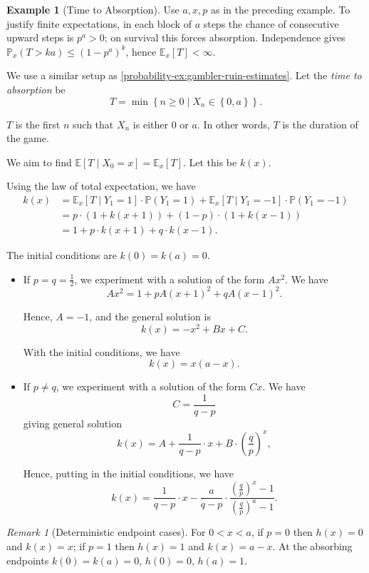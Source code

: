 \documentclass[11pt]{article}
\numberwithin{equation}{section}
\theoremstyle{definition}
\newtheorem{example}[theorem]{Example}
\theoremstyle{remark}
\newtheorem{remark}[theorem]{Remark}
\newcommand{\pqty}[1]{\left(#1\right)}
\newcommand{\bqty}[1]{\left[#1\right]}
\newcommand{\Bqty}[1]{\left\{#1\right\}}
\newcommand{\set}[2]{\left\{#1\mid #2\right\}}
\newcommand{\Prob}{\mathbb P}
\newcommand{\Expt}{\mathbb E}
\newcommand{\Conditional}[2]{#1\mid #2}
\begin{document}
\begin{example}[Time to Absorption]\label{probability-example-030}
    \label{probability-ex:time-to-absorption}%
Use \(a,x,p\) as in the preceding example. To justify finite expectations, in each block of \(a\) steps the chance of consecutive upward steps is \(p^a>0\); on survival this forces absorption. Independence gives
\(\Prob_x(T>ka)\le(1-p^a)^k\), hence \(\Expt_x[T]<\infty\).

    We use a similar setup as \autoref{probability-ex:gambler-ruin-estimates}. Let the \emph{time to absorption} be
    \[
        T = \min \set{n \geq 0}{X_n \in \Bqty{0, a}}.
    \]

    \(T\) is the first \(n\) such that \(X_n\) is either \(0\) or \(a\). In other words, \(T\) is the duration of the game.

    We aim to find \(\Expt\bqty{\Conditional{T}{X_0 = x}} = \Expt_x\bqty{T}\). Let this be \(k\pqty{x}\).

    Using the law of total expectation, we have
    \begin{align*}
        k\pqty{x} &= \Expt_x\bqty{\Conditional{T}{Y_1 = 1}} \cdot \Prob\pqty{Y_1 = 1} + \Expt_x\bqty{\Conditional{T}{Y_1 = -1}} \cdot \Prob\pqty{Y_1 = -1} \\
        &= p \cdot \pqty{1 + k\pqty{x + 1}} + \pqty{1 - p} \cdot \pqty{1 + k\pqty{x - 1}} \\
        &= 1 + p \cdot k\pqty{x + 1} + q \cdot k\pqty{x - 1}.
    \end{align*}

    The initial conditions are \(k \pqty{0} = k \pqty{a} = 0\).
    \begin{itemize}
        \item If \(p = q = \frac{1}{2}\), we experiment with a solution of the form \(A x^2\). We have
        \[
            A x^2 = 1 + p A\pqty{x + 1}^2 + q A\pqty{x - 1}^2.
        \]

        Hence, \(A = -1\), and the general solution is
        \[
            k\pqty{x}= -x^2 + Bx + C.
        \]

        With the initial conditions, we have
        \[
            k\pqty{x} = x \pqty{a - x}.
        \]

        \item If \(p \neq q\), we experiment with a solution of the form \(Cx\). We have
        \[
            C = \frac{1}{q - p}
        \]
        giving general solution
        \[
            k\pqty{x} = A + \frac{1}{q - p} \cdot x + B \cdot \pqty{\frac{q}{p}}^x,
        \]

        Hence, putting in the initial conditions, we have
        \[
            k\pqty{x} = \frac{1}{q - p} \cdot x - \frac{a}{q - p} \cdot \frac{\pqty{\frac{q}{p}}^x - 1}{\pqty{\frac{q}{p}}^a - 1}.
        \]
    \end{itemize}
\end{example}
\begin{remark}[Deterministic endpoint cases]\label{probability-remark-006}
For \(0<x<a\), if \(p=0\) then \(h(x)=0\) and \(k(x)=x\);
if \(p=1\) then \(h(x)=1\) and \(k(x)=a-x\). At the absorbing endpoints
\(k(0)=k(a)=0\), \(h(0)=0\), \(h(a)=1\).
\end{remark}
\end{document}
